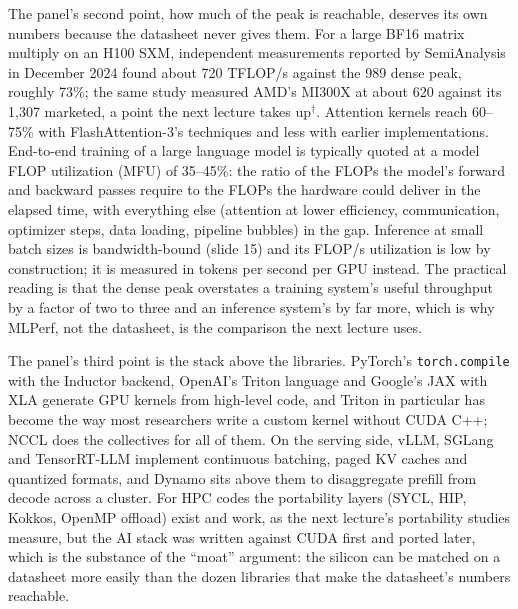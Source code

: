 \documentclass[11pt,letterpaper]{article}
\begin{document}
The panel's second point, how much of the peak is reachable, deserves its own numbers because the datasheet never gives them. For a large BF16 matrix multiply on an H100 SXM, independent measurements reported by SemiAnalysis in December 2024 found about 720 TFLOP/s against the 989 dense peak, roughly 73\%; the same study measured AMD's MI300X at about 620 against its 1,307 marketed, a point the next lecture takes up$^\dagger$. Attention kernels reach 60--75\% with FlashAttention-3's techniques and less with earlier implementations. End-to-end training of a large language model is typically quoted at a model FLOP utilization (MFU) of 35--45\%: the ratio of the FLOPs the model's forward and backward passes require to the FLOPs the hardware could deliver in the elapsed time, with everything else (attention at lower efficiency, communication, optimizer steps, data loading, pipeline bubbles) in the gap. Inference at small batch sizes is bandwidth-bound (slide 15) and its FLOP/s utilization is low by construction; it is measured in tokens per second per GPU instead. The practical reading is that the dense peak overstates a training system's useful throughput by a factor of two to three and an inference system's by far more, which is why MLPerf, not the datasheet, is the comparison the next lecture uses.

The panel's third point is the stack above the libraries. PyTorch's \texttt{torch.compile} with the Inductor backend, OpenAI's Triton language and Google's JAX with XLA generate GPU kernels from high-level code, and Triton in particular has become the way most researchers write a custom kernel without CUDA C++; NCCL does the collectives for all of them. On the serving side, vLLM, SGLang and TensorRT-LLM implement continuous batching, paged KV caches and quantized formats, and Dynamo sits above them to disaggregate prefill from decode across a cluster. For HPC codes the portability layers (SYCL, HIP, Kokkos, OpenMP offload) exist and work, as the next lecture's portability studies measure, but the AI stack was written against CUDA first and ported later, which is the substance of the ``moat'' argument: the silicon can be matched on a datasheet more easily than the dozen libraries that make the datasheet's numbers reachable.
\end{document}

